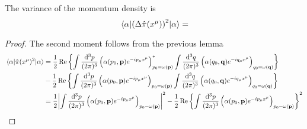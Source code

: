 \begin{corollary}
	The variance of the momentum density is
	\begin{equation}
		\expval{\left(\Delta\hat\pi(x^\mu)\right)^2}{\alpha}
		=
	\end{equation}
\end{corollary}
\begin{proof}
	The second moment follows from the previous lemma
	\begin{equation*}
		\begin{split}
			\expval{\hat\pi(x^\mu)^2}{\alpha}
			&=
			\frac{1}{2}
			\operatorname{\operatorname{Re}}\left\{
				\int\frac{\dd[3]{p}}{(2\pi)^3}
				\left(
					\alpha(p_0,\vb{p})
					e^{-ip_\mu x^\mu}
				\right)^*_{p_0=\omega(\vb{p})}
				\int\frac{\dd[3]{q}}{(2\pi)^3}
				\left(
					\alpha(q_0,\vb{q})
					e^{-iq_\mu x^\mu}
				\right)_{q_0=\omega(\vb{q})}			
			\right\}
			\\
			&-
			\frac{1}{2}
			\operatorname{\operatorname{Re}}\left\{
				\int\frac{\dd[3]{p}}{(2\pi)^3}
				\left(
					\alpha(p_0,\vb{p})
					e^{-ip_\mu x^\mu}
				\right)_{p_0=\omega(\vb{p})}
				\int\frac{\dd[3]{q}}{(2\pi)^3}
				\left(
					\alpha(q_0,\vb{q})
					e^{-iq_\mu x^\mu}
				\right)_{q_0=\omega(\vb{q})}
			\right\}
			\\
			&=
			\frac{1}{2}
			\abs{
				\int\frac{\dd[3]{p}}{(2\pi)^3}
				\left(
					\alpha(p_0,\vb{p})
					e^{-ip_\mu x^\mu}
				\right)_{p_0=\omega(\vb{p})}
			}^2
			-
			\frac{1}{2}
			\operatorname{\operatorname{Re}}\left\{
				\int\frac{\dd[3]{p}}{(2\pi)^3}
				\left(
					\alpha(p_0,\vb{p})
					e^{-ip_\mu x^\mu}
				\right)_{p_0=\omega(\vb{p})}
			\right\}^2
		\end{split}
	\end{equation*}
\end{proof}